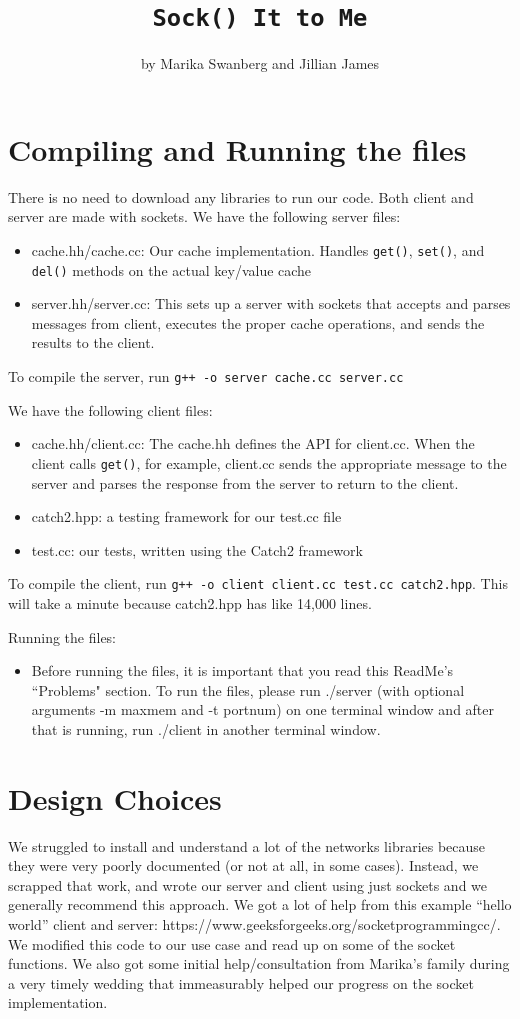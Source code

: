 \documentclass[12pt]{article}
\author{by Marika Swanberg and Jillian James}
\title{\texttt{Sock() It to Me}}
\date{}
\begin{document}
\maketitle
\bigskip 
\section{Compiling and Running the files}
There is no need to download any libraries to run our code. Both client and server are made with sockets.
We have the following server files:
\begin{itemize}
\item cache.hh/cache.cc: Our cache implementation. Handles \texttt{get()}, \texttt{set()}, and  \texttt{del()} methods on the actual key/value cache
\item server.hh/server.cc: This sets up a server with sockets that accepts and parses messages from client, executes the proper cache operations, and sends the results to the client.
\end{itemize}
To compile the server, run \texttt{g++ -o server cache.cc server.cc} 
\bigskip

We have the following client files:
\begin{itemize}
\item cache.hh/client.cc: The cache.hh defines the API for client.cc. When the client calls \texttt{get()}, for example, client.cc sends the appropriate message to the server and parses the response from the server to return to the client.
\item catch2.hpp: a testing framework for our test.cc file
\item test.cc: our tests, written using the Catch2 framework
\end{itemize}
To compile the client, run \texttt{g++ -o client client.cc test.cc catch2.hpp}. This will take a minute because catch2.hpp has like 14,000 lines.
\bigskip

Running the files:
\begin{itemize}
\item Before running the files, it is important that you read this ReadMe's ``Problems" section. To run the files, please run ./server (with optional arguments -m maxmem and -t portnum) on one terminal window and after that is running, run ./client in another terminal window.
\end{itemize}

\section{Design Choices}
We struggled to install and understand a lot of the networks libraries because they were very poorly documented (or not at all, in some cases). Instead, we scrapped that work, and wrote our server and client using just sockets and we generally recommend this approach. We got a lot of help from this example ``hello world'' client and server: https:\//\//www.geeksforgeeks.org\//socket\-programming\-cc/. We modified this code to our use case and read up on some of the socket functions. We also got some initial help/consultation from Marika's family during a very timely wedding that immeasurably helped our progress on the socket implementation.
\end{document}
